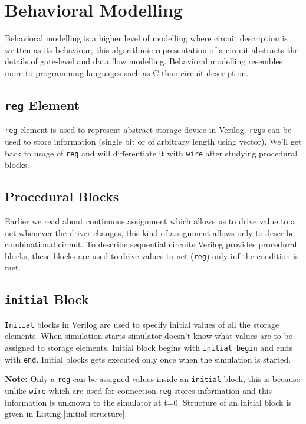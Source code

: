 \documentclass[a4paper,10pt]{article}
\theoremstyle{mytheor}
\begin{document}
\section{Behavioral Modelling}
Behavioral modelling is a higher level of modelling where circuit
description is written as its behaviour, this algorithmic
representation of a circuit abstracts the details of gate-level and
data flow modelling. Behavioral modelling resembles more to
programming languages such as C than circuit description.


\subsection{\lstinline[style=verilog-inline-style]{reg} Element}
\lstinline[style=verilog-inline-style]{reg} element is used to
represent abstract storage device in
Verilog. \lstinline[style=verilog-inline-style]{reg}s can be used to
store information (single bit or of arbitrary length using
vector). We'll get back to usage of
\lstinline[style=verilog-inline-style]{reg} and will differentiate it
with \lstinline[style=verilog-inline-style]{wire} after studying
procedural blocks.

\subsection{Procedural Blocks}
Earlier we read about continuous assignment which allows us to drive
value to a net whenever the driver changes, this kind of assignment
allows only to describe combinational circuit. To describe sequential
circuits Verilog provides procedural blocks, these blocks are used to
drive values to net (\lstinline[style=verilog-inline-style]{reg}) only
inf the condition is met.

\subsection{\lstinline[style=verilog-inline-style]{initial} Block}
\lstinline[style=verilog-inline-style]{Initial} blocks in Verilog are
used to specify initial values of all the storage elements. When
simulation starts simulator doesn't know what values are to be
assigned to storage elements. Initial block begins with
\lstinline[style=verilog-inline-style]{initial begin} and ends with
\lstinline[style=verilog-inline-style]{end}. Initial blocks gets
executed only once when the simulation is started.

{\color{red}\textbf{Note:}} Only a
\lstinline[style=verilog-inline-style]{reg} can be assigned values
inside an \lstinline[style=verilog-inline-style]{initial} block, this
is because unlike \lstinline[style=verilog-inline-style]{wire} which
are used for connection \lstinline[style=verilog-inline-style]{reg}
stores information and this information is unknown to the simulator at
t=0. Structure of an initial block is given in Listing \ref{initial-structure}.
\end{document}
